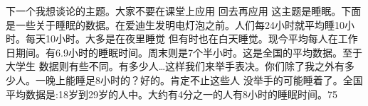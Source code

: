 下一个我想谈论的主题。大家不要在课堂上应用 回去再应用 这主题是睡眠。下面是一些关于睡眠的数据。在爱迪生发明电灯泡之前。人们每24小时就平均睡10小时。每天10小时。大多是在夜里睡觉 但有时也在白天睡觉。现今平均每人在工作日期间。有6.9小时的睡眠时间。周末则是7个半小时。这是全国的平均数据。至于大学生 数据则有些不同。有多少人…这样我们来举手表决。你们除了我之外有多少人。一晚上能睡足8小时的？好的。肯定不止这些人 没举手的可能睡着了。全国平均数据是:18岁到29岁的人中。大约有4分之一的人有8小时的睡眠时间。75%

